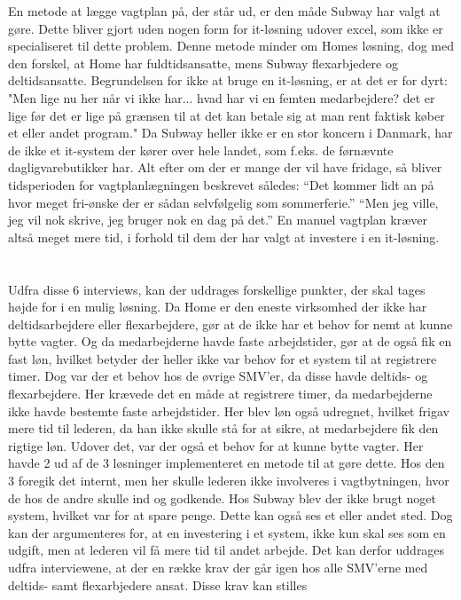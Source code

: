 En metode at lægge vagtplan på, der står ud, er den måde Subway har valgt at gøre. Dette bliver gjort uden nogen form for it-løsning udover excel, som ikke er specialiseret til dette problem. Denne metode minder om Homes løsning, dog med den forskel, at Home har fuldtidsansatte, mens Subway flexarbjedere og deltidsansatte. Begrundelsen for ikke at bruge en it-løsning, er at det er for dyrt: "Men lige nu her når vi ikke har... hvad har vi en femten medarbejdere? det er lige før det er lige på grænsen til at det kan betale sig at man rent faktisk køber et eller andet program."
Da Subway heller ikke er en stor koncern i Danmark, har de ikke et it-system der kører over hele landet, som f.eks. de førnævnte dagligvarebutikker har. Alt efter om der er mange der vil have fridage, så bliver tidsperioden for vagtplanlægningen beskrevet således: “Det kommer lidt an på hvor meget fri-ønske der er sådan selvfølgelig som sommerferie.” “Men jeg ville, jeg vil nok skrive, jeg bruger nok en dag på det.” En manuel vagtplan kræver altså meget mere tid, i forhold til dem der har valgt at investere i en it-løsning.
\\\\\\Udfra disse 6 interviews, kan der uddrages forskellige punkter, der skal tages højde for i en mulig løsning. Da Home er den eneste virksomhed der ikke har deltidsarbejdere eller flexarbejdere, gør at de ikke har et behov for nemt at kunne bytte vagter. Og da medarbejderne havde faste arbejdstider, gør at de også fik en fast løn, hvilket betyder der heller ikke var behov for et system til at registrere timer. Dog var der et behov hos de øvrige SMV’er, da disse havde deltids- og flexarbejdere. Her krævede det en måde at registrere timer, da medarbejderne ikke havde bestemte faste arbejdstider. Her blev løn også udregnet, hvilket frigav mere tid til lederen, da han ikke skulle stå for at sikre, at medarbejdere fik den rigtige løn. Udover det, var der også et behov for at kunne bytte vagter. Her havde 2 ud af de 3 løsninger implementeret en metode til at gøre dette. Hos den 3 foregik det internt, men her skulle lederen ikke involveres i vagtbytningen, hvor de hos de andre skulle ind og godkende. Hos Subway blev der ikke brugt noget system, hvilket var for at spare penge. Dette kan også ses et eller andet sted. 
Dog kan der argumenteres for, at en investering i et system, ikke kun skal ses som en udgift, men at lederen vil få mere tid til andet arbejde. Det kan derfor uddrages udfra interviewene, at der en række krav der går igen hos alle SMV'erne med deltids- samt flexarbjedere ansat. Disse krav kan stilles 


